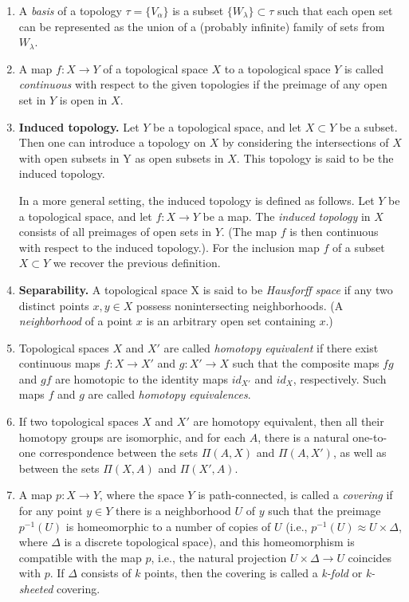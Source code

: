 \documentclass{article}
\begin{document}
\begin{enumerate}
\item A \textit{basis} of a topology $\tau = \{ V_\alpha \}$ is a subset
$\{ W_\lambda \} \subset \tau$ such that each open set can be represented
as the union of a (probably infinite) family of sets from $W_\lambda$.

\item A map $f : X \to Y$ of a topological space $X$ to a topological space
$Y$ is called \textit{continuous} with respect to the given topologies
if the preimage of any open set in $Y$ is open in $X$.

\item \textbf{Induced topology.} Let $Y$ be a topological space, and
  let $X \subset Y$ be a subset. Then one can introduce a topology on
  $X$ by considering the intersections of $X$ with open subsets in Y
  as open subsets in $X$. This topology is said to be the induced
  topology.

In a more general setting, the induced topology is defined as
follows. Let $Y$ be a topological space, and let $f : X \to Y$ be a
map. The \textit{induced topology} in $X$ consists of all preimages of
open sets in $Y$. (The map $f$ is then continuous with respect to the
induced topology.). For the inclusion map $f$ of a subset $X \subset
Y$ we recover the previous definition.

\item \textbf{Separability.} A topological space X is said to be
  \textit{Hausforff space} if any two distinct points $x,y \in X$
  possess nonintersecting neighborhoods. (A \textit{neighborhood} of a
  point $x$ is an arbitrary open set containing $x$.)

\item Topological spaces $X$ and $X'$ are called \textit{homotopy
    equivalent} if there exist continuous maps $f : X \to X'$ and $g :
  X' \to X$ such that the composite maps $fg$ and $gf$ are homotopic
  to the identity maps $id_{X'}$ and $id_X$, respectively. Such maps $f$
  and $g$ are called \textit{homotopy equivalences}.

\item If two topological spaces $X$ and $X'$ are homotopy equivalent,
  then all their homotopy groups are isomorphic, and for each $A$,
  there is a natural one-to-one correspondence between the sets
  $\Pi(A,X)$ and $\Pi(A,X')$, as well as between the sets $\Pi(X,A)$
  and $\Pi(X',A)$.

\item A map $p : X \to Y$, where the space $Y$ is path-connected, is
  called a \textit{covering} if for any point $y \in Y$ there is a
  neighborhood $U$ of $y$ such that the preimage $p^{-1}(U)$ is
  homeomorphic to a number of copies of $U$ (i.e., $p^{-1}(U) \approx
  U \times \Delta$, where $\Delta$ is a discrete topological space),
  and this homeomorphism is compatible with the map $p$, i.e., the
  natural projection $U \times \Delta \to U$ coincides with $p$. If $\Delta$
  consists of $k$ points, then the covering is called a
  \textit{k-fold} or \textit{k-sheeted} covering.


\end{enumerate}
\end{document}
